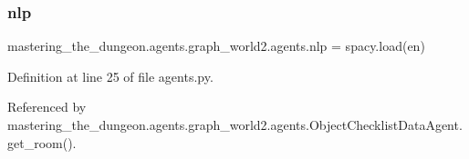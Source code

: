 \subsubsection{\texorpdfstring{nlp}{nlp}}
{\footnotesize\ttfamily mastering\+\_\+the\+\_\+dungeon.\+agents.\+graph\+\_\+world2.\+agents.\+nlp = spacy.\+load(\textquotesingle{}en\textquotesingle{})}



Definition at line 25 of file agents.\+py.



Referenced by mastering\+\_\+the\+\_\+dungeon.\+agents.\+graph\+\_\+world2.\+agents.\+Object\+Checklist\+Data\+Agent.\+get\+\_\+room().

